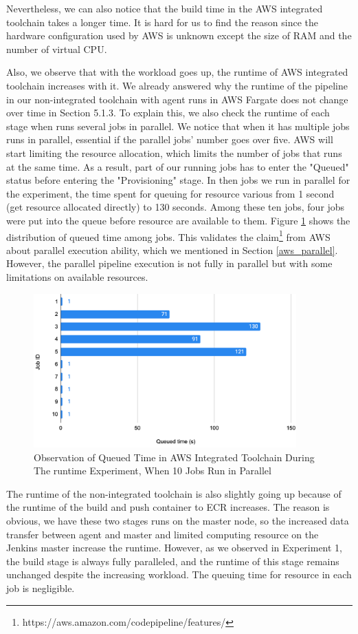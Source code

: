  Nevertheless, we can also notice that the build time in the AWS integrated toolchain takes a longer time. It is hard for us to find the reason since the hardware configuration used by AWS is unknown except the size of RAM and the number of virtual CPU.
\par
 Also, we observe that with the workload goes up, the runtime of AWS integrated toolchain increases with it. We already answered why the runtime of the pipeline in our non-integrated toolchain with agent runs in AWS Fargate does not change over time in Section 5.1.3. To explain this, we also check the runtime of each stage when runs several jobs in parallel. We notice that when it has multiple jobs runs in parallel, essential if the parallel jobs' number goes over five. AWS will start limiting the resource allocation, which limits the number of jobs that runs at the same time. As a result, part of our running jobs has to enter the "Queued" status before entering the "Provisioning" stage. In then jobs we run in parallel for the experiment, the time spent for queuing for resource various from 1 second (get resource allocated directly) to 130 seconds. Among these ten jobs, four jobs were put into the queue before resource are available to them. Figure \ref{fig:queued} shows the distribution of queued time among jobs. This validates the claim\footnote{https://aws.amazon.com/codepipeline/features/} from AWS about parallel execution ability, which we mentioned in Section \ref{aws_parallel}. However, the parallel pipeline execution is not fully in parallel but with some limitations on available resources.
 \begin{figure}[!h]
  \centering
  \includegraphics[width=0.90\textwidth]{pics/queued_time.png}
  \caption{Observation of Queued Time in AWS Integrated Toolchain During The runtime Experiment, When 10 Jobs Run in Parallel}
  \label{fig:queued}
\end{figure}
 \par
 The runtime of the non-integrated toolchain is also slightly going up because of the runtime of the build and push container to ECR increases. The reason is obvious, we have these two stages runs on the master node, so the increased data transfer between agent and master and limited computing resource on the Jenkins master increase the runtime. However, as we observed in Experiment 1, the build stage is always fully paralleled, and the runtime of this stage remains unchanged despite the increasing workload. The queuing time for resource in each job is negligible.

